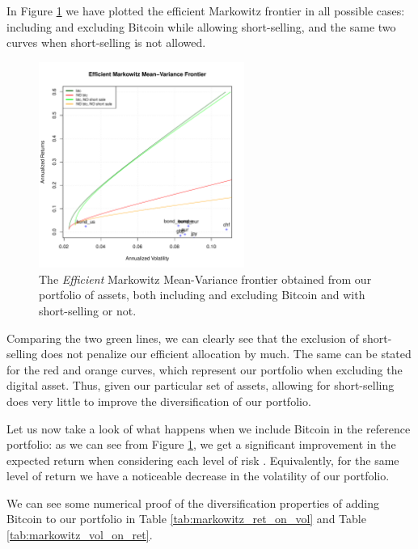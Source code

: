 In Figure \ref{fig:efficient_frontier_comparison} we have plotted the efficient Markowitz frontier in all possible cases: including and excluding Bitcoin while allowing short-selling, and the same two curves when short-selling is not allowed.
\begin{figure}
	\centering
	\includegraphics[width=0.6\textwidth]{Images/efficient_frontier.pdf}
	\caption[Markowitz Efficient frontier comparison]{The \textit{Efficient} Markowitz Mean-Variance frontier obtained from our portfolio of assets, both including and excluding Bitcoin and with short-selling or not.}
	\label{fig:efficient_frontier_comparison}
\end{figure}

Comparing the two green lines, we can clearly see that the exclusion of short-selling does not penalize our efficient allocation by much. The same can be stated for the red and orange curves, which represent our portfolio when excluding the digital asset.
Thus, given our particular set of assets, allowing for short-selling does very little to improve the diversification of our portfolio.

Let us now take a look of what happens when we include Bitcoin in the reference portfolio: as we can see from Figure \ref{fig:efficient_frontier_comparison}, we get a significant improvement in the expected return when considering each level of risk . Equivalently, for the same level of return we have a noticeable decrease in the volatility of our portfolio.


We can see some numerical proof of the diversification properties of adding Bitcoin to our portfolio in Table \ref{tab:markowitz_ret_on_vol} and Table	\ref{tab:markowitz_vol_on_ret}.

